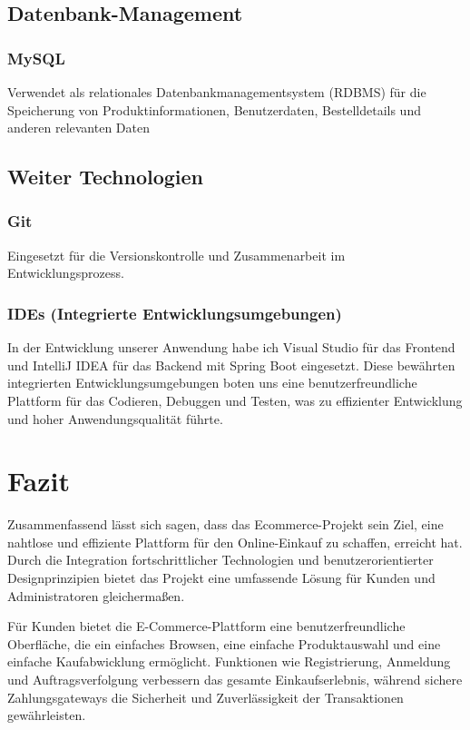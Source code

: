	 \section{Datenbank-Management}
	 \subsection{MySQL}
	 Verwendet als relationales Datenbankmanagementsystem (RDBMS) für die Speicherung von Produktinformationen, Benutzerdaten, Bestelldetails und anderen relevanten Daten
	 \section{Weiter Technologien}
	 \subsection{Git}
	 Eingesetzt für die Versionskontrolle und Zusammenarbeit im Entwicklungsprozess.
	 \subsection{IDEs (Integrierte Entwicklungsumgebungen)}
	 In der Entwicklung unserer Anwendung habe ich Visual Studio für das Frontend und IntelliJ IDEA für das Backend mit Spring Boot eingesetzt. Diese bewährten integrierten Entwicklungsumgebungen boten uns eine benutzerfreundliche Plattform für das Codieren, Debuggen und Testen, was zu effizienter Entwicklung und hoher Anwendungsqualität führte.
	
	\appendix
	
	
	\makeatletter
	{\chapter*{Fazit}}
	\makeatother
	Zusammenfassend lässt sich sagen, dass das Ecommerce-Projekt sein Ziel, eine nahtlose und effiziente Plattform für den Online-Einkauf zu schaffen, erreicht hat. Durch die Integration fortschrittlicher Technologien und benutzerorientierter Designprinzipien bietet das Projekt eine umfassende Lösung für Kunden und Administratoren gleichermaßen.
	
	Für Kunden bietet die E-Commerce-Plattform eine benutzerfreundliche Oberfläche, die ein einfaches Browsen, eine einfache Produktauswahl und eine einfache Kaufabwicklung ermöglicht. Funktionen wie Registrierung, Anmeldung und Auftragsverfolgung verbessern das gesamte Einkaufserlebnis, während sichere Zahlungsgateways die Sicherheit und Zuverlässigkeit der Transaktionen gewährleisten.
	

